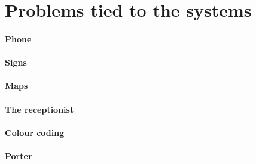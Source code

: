 \section{Problems tied to the systems} %
\label{sec:Problems_tied_to_the_systems}

\paragraph{Phone}


\paragraph{Signs}


\paragraph{Maps}

\paragraph{The receptionist}


\paragraph{Colour coding}

\paragraph{Porter}

